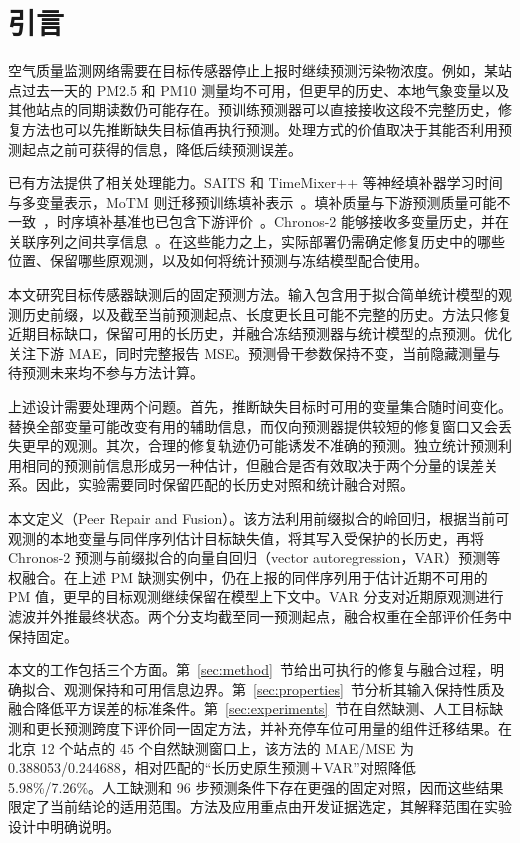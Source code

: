 \section{引言}
\label{sec:introduction}

空气质量监测网络需要在目标传感器停止上报时继续预测污染物浓度。例如，某站点过去一天的 PM2.5 和 PM10 测量均不可用，但更早的历史、本地气象变量以及其他站点的同期读数仍可能存在。预训练预测器可以直接接收这段不完整历史，修复方法也可以先推断缺失目标值再执行预测。处理方式的价值取决于其能否利用预测起点之前可获得的信息，降低后续预测误差。

已有方法提供了相关处理能力。SAITS 和 TimeMixer++ 等神经填补器学习时间与多变量表示，MoTM 则迁移预训练填补表示~\citep{du2023saits,wang2025timemixerpp,motmsoftware}。填补质量与下游预测质量可能不一致~\citep{lemorvan2021good}，时序填补基准也已包含下游评价~\citep{du2024tsibench}。Chronos-2 能够接收多变量历史，并在关联序列之间共享信息~\citep{ansari2025chronos2}。在这些能力之上，实际部署仍需确定修复历史中的哪些位置、保留哪些原观测，以及如何将统计预测与冻结模型配合使用。

本文研究目标传感器缺测后的固定预测方法。输入包含用于拟合简单统计模型的观测历史前缀，以及截至当前预测起点、长度更长且可能不完整的历史。方法只修复近期目标缺口，保留可用的长历史，并融合冻结预测器与统计模型的点预测。优化关注下游 MAE，同时完整报告 MSE。预测骨干参数保持不变，当前隐藏测量与待预测未来均不参与方法计算。

上述设计需要处理两个问题。首先，推断缺失目标时可用的变量集合随时间变化。替换全部变量可能改变有用的辅助信息，而仅向预测器提供较短的修复窗口又会丢失更早的观测。其次，合理的修复轨迹仍可能诱发不准确的预测。独立统计预测利用相同的预测前信息形成另一种估计，但融合是否有效取决于两个分量的误差关系。因此，实验需要同时保留匹配的长历史对照和统计融合对照。

本文定义\method{}（Peer Repair and Fusion）。该方法利用前缀拟合的岭回归，根据当前可观测的本地变量与同伴序列估计目标缺失值，将其写入受保护的长历史，再将 Chronos-2 预测与前缀拟合的向量自回归（vector autoregression，VAR）预测等权融合。在上述 PM 缺测实例中，仍在上报的同伴序列用于估计近期不可用的 PM 值，更早的目标观测继续保留在模型上下文中。VAR 分支对近期原观测进行滤波并外推最终状态。两个分支均截至同一预测起点，融合权重在全部评价任务中保持固定。

本文的工作包括三个方面。第~\ref{sec:method}~节给出可执行的修复与融合过程，明确拟合、观测保持和可用信息边界。第~\ref{sec:properties}~节分析其输入保持性质及融合降低平方误差的标准条件。第~\ref{sec:experiments}~节在自然缺测、人工目标缺测和更长预测跨度下评价同一固定方法，并补充停车位可用量的组件迁移结果。在北京 12 个站点的 45 个自然缺测窗口上，该方法的 MAE/MSE 为 0.388053/0.244688，相对匹配的“长历史原生预测＋VAR”对照降低 5.98\%/7.26\%。人工缺测和 96 步预测条件下存在更强的固定对照，因而这些结果限定了当前结论的适用范围。方法及应用重点由开发证据选定，其解释范围在实验设计中明确说明。


